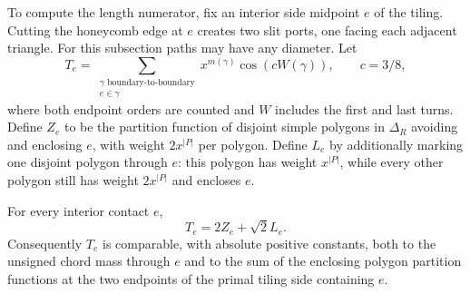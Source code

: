 To compute the length numerator, fix an interior side midpoint $e$ of
the tiling. Cutting the honeycomb edge at $e$ creates two slit ports,
one facing each adjacent triangle. For this subsection paths may have
any diameter. Let
\[
 T_e=\sum_{\substack{\gamma\text{ boundary-to-boundary}\\e\in\gamma}}
 x^{m(\gamma)}\cos(cW(\gamma)),\qquad c=3/8,
\]
where both endpoint orders are counted and $W$ includes the first and
last turns. Define $Z_e$ to be the partition function of disjoint simple
polygons in $\Delta_R$ avoiding and enclosing $e$, with weight
$2x^{|P|}$ per polygon. Define $L_e$ by additionally marking one
disjoint polygon through $e$: this polygon has weight $x^{|P|}$,
while every other polygon still has weight $2x^{|P|}$ and encloses $e$.



\begin{lemma}\label{lem:slit}
For every interior contact $e$,
\[
 T_e=2Z_e+\sqrt2L_e.
\]
Consequently $T_e$ is comparable, with absolute positive constants,
both to the unsigned chord mass through $e$ and to the sum of the
enclosing polygon partition functions at the two endpoints of the
primal tiling side containing $e$.
\end{lemma}

